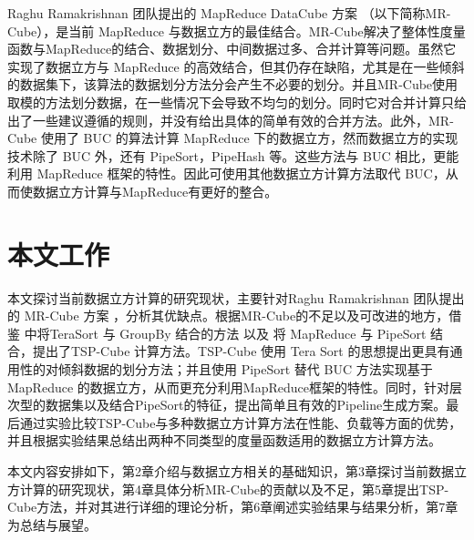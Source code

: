 Raghu Ramakrishnan 团队提出的 MapReduce DataCube 方案 \cite{nandi2012data} \cite{nandi2011distributed}（以下简称MR-Cube），是当前 MapReduce 与数据立方的最佳结合。MR-Cube解决了整体性度量函数与MapReduce的结合、数据划分、中间数据过多、合并计算等问题。虽然它实现了数据立方与 MapReduce 的高效结合，但其仍存在缺陷，尤其是在一些倾斜的数据集下，该算法的数据划分方法分会产生不必要的划分。并且MR-Cube使用取模的方法划分数据，在一些情况下会导致不均匀的划分。同时它对合并计算只给出了一些建议遵循的规则，并没有给出具体的简单有效的合并方法。此外，MR-Cube 使用了 BUC \cite{beyer1999bottom} 的算法计算 MapReduce 下的数据立方，然而数据立方的实现技术除了 BUC 外，还有 PipeSort，PipeHash \cite{agarwal1996computation} 等。这些方法与 BUC 相比，更能利用 MapReduce 框架的特性。因此可使用其他数据立方计算方法取代 BUC，从而使数据立方计算与MapReduce有更好的整合。










\section{本文工作}


本文探讨当前数据立方计算的研究现状，主要针对Raghu Ramakrishnan 团队提出的 MR-Cube 方案 \cite{nandi2012data} \cite{nandi2011distributed}，分析其优缺点。根据MR-Cube的不足以及可改进的地方，借鉴\cite{tao2013minimal} 中将TeraSort 与 GroupBy 结合的方法 以及 将 MapReduce 与 PipeSort 结合，提出了TSP-Cube 计算方法。TSP-Cube 使用 Tera Sort 的思想提出更具有通用性的对倾斜数据的划分方法；并且使用 PipeSort 替代 BUC 方法实现基于 MapReduce 的数据立方，从而更充分利用MapReduce框架的特性。同时，针对层次型的数据集以及结合PipeSort的特征，提出简单且有效的Pipeline生成方案。最后通过实验比较TSP-Cube与多种数据立方计算方法在性能、负载等方面的优势，并且根据实验结果总结出两种不同类型的度量函数适用的数据立方计算方法。



本文内容安排如下，第2章介绍与数据立方相关的基础知识，第3章探讨当前数据立方计算的研究现状，第4章具体分析MR-Cube的贡献以及不足，第5章提出TSP-Cube方法，并对其进行详细的理论分析，第6章阐述实验结果与结果分析，第7章为总结与展望。

